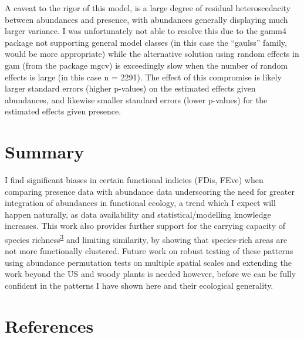 \documentclass[
  10pt,
]{article}
\begin{document}
A caveat to the rigor of this model, is a large degree of residual heteroscedacity between abundances and presence, with abundances generally displaying much larger variance. I was unfortunately not able to resolve this due to the gamm4 package not supporting general model classes (in this case the ``gaulss'' family, would be more appropriate) while the alternative solution using random effects in gam (from the package mgcv) is exceedingly slow when the number of random effects is large (in this case n = 2291). The effect of this compromise is likely larger standard errors (higher p-values) on the estimated effects given abundances, and likewise smaller standard errors (lower p-values) for the estimated effects given presence.

\hypertarget{summary}{%
\section{Summary}\label{summary}}

I find significant biases in certain functional indicies (FDis, FEve) when comparing presence data with abundance data underscoring the need for greater integration of abundances in functional ecology, a trend which I expect will happen naturally, as data availability and statistical/modelling knowledge increases. This work also provides further support for the carrying capacity of species richness\textsuperscript{\protect\hyperlink{ref-Storch2019}{3}} and limiting similarity, by showing that species-rich areas are not more functionally clustered. Future work on robust testing of these patterns using abundance permutation tests on multiple spatial scales and extending the work beyond the US and woody plants is needed however, before we can be fully confident in the patterns I have shown here and their ecological generality.

\newpage

\hypertarget{references}{%
\section{References}\label{references}}
\end{document}
